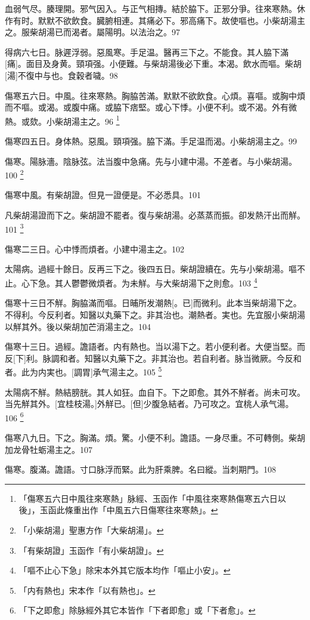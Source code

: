 \documentclass[12pt,oneside,UTF8,b5paper]{ctexbook}她她她她她她她
\begin{document}
血弱气尽。腠理開。邪气因入。与正气相摶。結於脇下。正邪分爭。往來寒熱。休作有时。默默不欲飲食。臓腑相連。其痛必下。邪高痛下。故使嘔也。小柴胡湯主之。服柴胡湯已而渴者。屬陽明。以法治之。97

得病六七日。脉遲浮弱。惡風寒。手足温。醫再三下之。不能食。其人脇下滿[痛]。面目及身黄。頸項强。小便難。与柴胡湯後必下重。本渴。飲水而嘔。柴胡[湯]不復中与也。食穀者噦。98

傷寒五六日。中風。往來寒熱。胸脇苦滿。默默不欲飲食。心煩。喜嘔。或胸中煩而不嘔。或渴。或腹中痛。或脇下痞堅。或心下悸。小便不利。或不渴。外有微熱。或欬。小柴胡湯主之。96
	\footnote{「傷寒五六日中風往來寒熱」脉經、玉函作「中風往來寒熱傷寒五六日以後」，玉函此條重出作「中風五六日傷寒往來寒熱」。}

傷寒四五日。身体熱。惡風。頸項强。脇下滿。手足温而渴。小柴胡湯主之。99

傷寒。陽脉濇。陰脉弦。法当腹中急痛。先与小建中湯。不差者。与小柴胡湯。100
	\footnote{「小柴胡湯」聖惠方作「大柴胡湯」。}

傷寒中風。有柴胡證。但見一證便是。不必悉具。101

凡柴胡湯證而下之。柴胡證不罷者。復与柴胡湯。必蒸蒸而振。卻发熱汗出而觧。101
	\footnote{「有柴胡證」玉函作「有小柴胡證」。}

傷寒二三日。心中悸而煩者。小建中湯主之。102

太陽病。過經十餘日。反再三下之。後四五日。柴胡證續在。先与小柴胡湯。嘔不止。心下急。其人鬱鬱微煩者。为未觧。与大柴胡湯下之則愈。103
	\footnote{「嘔不止心下急」除宋本外其它版本均作「嘔止小安」。}

傷寒十三日不觧。胸脇滿而嘔。日晡所发潮熱[。已]而微利。此本当柴胡湯下之。不得利。今反利者。知醫以丸藥下之。非其治也。潮熱者。実也。先宜服小柴胡湯以觧其外。後以柴胡加芒消湯主之。104

傷寒十三日。過經。譫語者。内有熱也。当以湯下之。若小便利者。大便当堅。而反[下]利。脉調和者。知醫以丸藥下之。非其治也。若自利者。脉当微厥。今反和者。此为内実也。[調胃]承气湯主之。105
	\footnote{「内有熱也」宋本作「以有熱也」。}

太陽病不觧。熱結膀胱。其人如狂。血自下。下之即愈。其外不觧者。尚未可攻。当先觧其外。[宜桂枝湯。]外觧已。[但]少腹急結者。乃可攻之。宜桃人承气湯。106
	\footnote{「下之即愈」除脉經外其它本皆作「下者即愈」或「下者愈」。}

傷寒八九日。下之。胸滿。煩。驚。小便不利。譫語。一身尽重。不可轉側。柴胡加龙骨牡蛎湯主之。107

傷寒。腹滿。譫語。寸口脉浮而緊。此为肝乘脾。名曰縱。当刺期門。108
\end{document}
